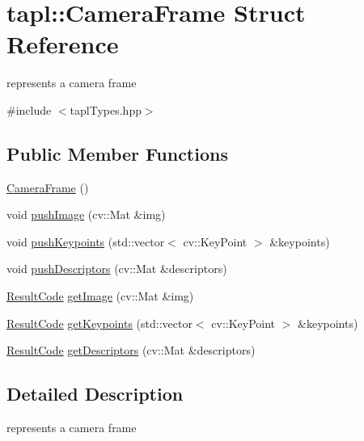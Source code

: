 \hypertarget{structtapl_1_1CameraFrame}{}\section{tapl\+:\+:Camera\+Frame Struct Reference}
\label{structtapl_1_1CameraFrame}


represents a camera frame  




{\ttfamily \#include $<$tapl\+Types.\+hpp$>$}

\subsection*{Public Member Functions}
\begin{DoxyCompactItemize}
\item 
\hyperlink{structtapl_1_1CameraFrame_a9f661d86590e6777e35170477b140c46}{Camera\+Frame} ()
\item 
void \hyperlink{structtapl_1_1CameraFrame_a3cd55417e231f33de32d6fe0491328f5}{push\+Image} (cv\+::\+Mat \&img)
\item 
void \hyperlink{structtapl_1_1CameraFrame_a615e5c9e86234c3a1ab0bff9385b2820}{push\+Keypoints} (std\+::vector$<$ cv\+::\+Key\+Point $>$ \&keypoints)
\item 
void \hyperlink{structtapl_1_1CameraFrame_a8fb1c882c8586540cad9ed46e8e2c575}{push\+Descriptors} (cv\+::\+Mat \&descriptors)
\item 
\hyperlink{namespacetapl_a196ce1d5bf399fc26f03797e6a8d03ff}{Result\+Code} \hyperlink{structtapl_1_1CameraFrame_a173bf0e309ba2a499425bb4d881c3a8f}{get\+Image} (cv\+::\+Mat \&img)
\item 
\hyperlink{namespacetapl_a196ce1d5bf399fc26f03797e6a8d03ff}{Result\+Code} \hyperlink{structtapl_1_1CameraFrame_aafb04677ac368c41616786d74cada301}{get\+Keypoints} (std\+::vector$<$ cv\+::\+Key\+Point $>$ \&keypoints)
\item 
\hyperlink{namespacetapl_a196ce1d5bf399fc26f03797e6a8d03ff}{Result\+Code} \hyperlink{structtapl_1_1CameraFrame_a2ecce3e76a8efdce3c799b404dcb790f}{get\+Descriptors} (cv\+::\+Mat \&descriptors)
\end{DoxyCompactItemize}


\subsection{Detailed Description}
represents a camera frame 

